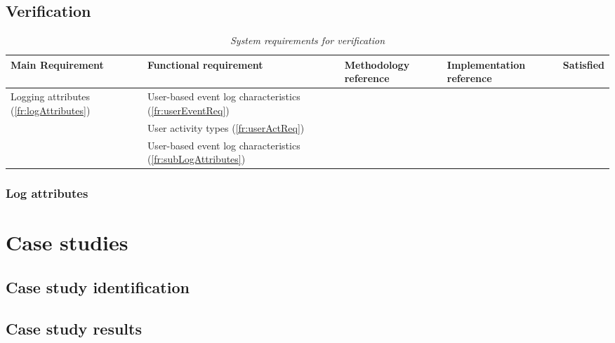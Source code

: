 \clearpage

\begin{landscape}
	\subsection{Verification}

	\begin{table}[!htb]
		\centering
		\small
		\caption[System requirements for verification]
		{\textit{System requirements for verification}}
		\label{tbl:ch2_verification}
		\begin{tabularx}{\linewidth}{|l|X|X|X|c|}
			\hline \textbf{Main Requirement} & \textbf{Functional requirement} & \textbf{Methodology reference} & \textbf{Implementation reference} & \textbf{Satisfied} \\ 
			\hline \multirow{3}{*}{Logging attributes (\ref{fr:logAttributes})} & User-based event log characteristics (\ref{fr:userEventReq}) & \Cref{sec:ch2_requirementsOfUAT} &  & \cmark \\
				& User activity types (\ref{fr:userActReq}) & \Cref{sec:ch2_userActivityTypes} &  & \cmark \\ \cline{2-5}
				& User-based event log characteristics (\ref{fr:subLogAttributes}) & \Cref{sec:ch2_logAttributesRequirements} & \Cref{sec:ch3_logAtrributes} & \cmark \\ \cline{2-5}\cline{2-5}
			\hline
		\end{tabularx}
	\end{table}
\end{landscape}

\clearpage

\subsubsection{Log attributes}

\section{Case studies}

\subsection{Case study identification}

\subsection{Case study results}

